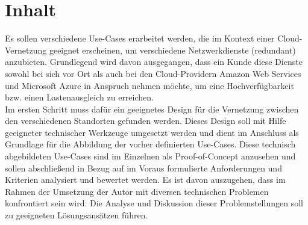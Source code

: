 \section{Inhalt}
Es sollen verschiedene Use-Cases erarbeitet werden, die im Kontext einer Cloud-Vernetzung geeignet erscheinen, um verschiedene Netzwerkdienste (redundant) anzubieten. Grundlegend wird davon ausgegangen, dass ein Kunde diese Dienste sowohl bei sich vor Ort als auch bei den Cloud-Providern Amazon Web Services und Microsoft Azure in Anspruch nehmen möchte, um eine Hochverfügbarkeit bzw. einen Lastenausgleich zu erreichen.\\
Im ersten Schritt muss dafür ein geeignetes Design für die Vernetzung zwischen den verschiedenen Standorten gefunden werden. Dieses Design soll mit Hilfe geeigneter technischer Werkzeuge umgesetzt werden und dient im Anschluss als Grundlage für die Abbildung der vorher definierten Use-Cases.
Diese technisch abgebildeten Use-Cases sind im Einzelnen als Proof-of-Concept anzusehen und sollen abschließend in Bezug auf im Voraus formulierte Anforderungen und Kriterien analysiert und bewertet werden.
Es ist davon auszugehen, dass im Rahmen der Umsetzung der Autor mit diversen technischen Problemen konfrontiert sein wird. Die Analyse und Diskussion dieser Problemstellungen soll zu geeigneten Lösungsansätzen führen.

